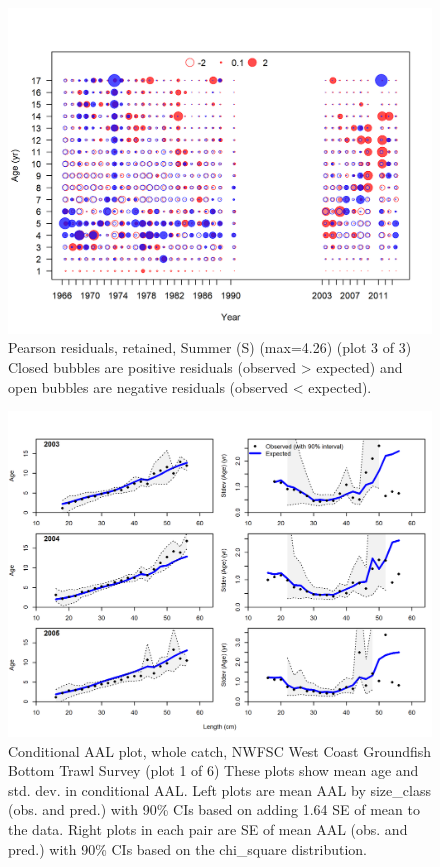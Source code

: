 \documentclass[12pt,]{article}
\begin{document}
\begin{figure}
\centering
\includegraphics{r4ss/plots_mod1/comp_agefit_residsflt4mkt2_page3.png}
\caption{Pearson residuals, retained, Summer (S) (max=4.26) (plot 3 of
3)\\
Closed bubbles are positive residuals (observed \textgreater{} expected)
and open bubbles are negative residuals (observed \textless{} expected).
\label{fig:ss_age_pearson}}
\end{figure}

\begin{figure}
\centering
\includegraphics{r4ss/plots_mod1/comp_condAALfit_Andre_plotsflt7mkt0_page1.png}
\caption{Conditional AAL plot, whole catch, NWFSC West Coast Groundfish
Bottom Trawl Survey (plot 1 of 6) These plots show mean age and std.
dev. in conditional AAL. Left plots are mean AAL by size\_class (obs.
and pred.) with 90\% CIs based on adding 1.64 SE of mean to the data.
Right plots in each pair are SE of mean AAL (obs. and pred.) with 90\%
CIs based on the chi\_square distribution.
\label{fig:nwfsc_combo_andre_1}}
\end{figure}
\end{document}
